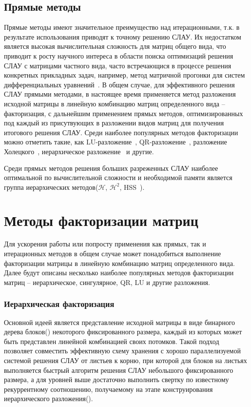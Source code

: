\subsection{Прямые методы}
Прямые методы имеют значительное преимущество над итерационными, т.к. в результате использования приводят к точному решению СЛАУ. Их недостатком является высокая вычислительная сложность для матриц общего вида, что приводит к росту научного интереса в области поиска оптимизаций решения СЛАУ с матрицами частного вида, часто встречающися в процессе решения конкретных прикладных задач, например, метод матричной прогонки для систем дифференциальных уравнений~\cite{progonka}. В общем случае, для эффективного решения СЛАУ прямыми методами, в настоящее время применяется метод разложения исходной матрицы в линейную комбинацию матриц определенного вида -- факторизация, с дальнейшим применением прямых методов, оптимизированных под каждый из присутвующих в разложении видов матриц для получения итогового решения СЛАУ. Среди наиболее популярных методов факторизации можно отметить такие, как LU-разложение~\cite{wikiLU}, QR-разложение~\cite{wikiQR}, разложение Холецкого~\cite{wikiCholesky}, иерархическое разложение~\cite{solverOverview, baseHSS} и другие.


Среди прямых методов решения больших разреженных СЛАУ наиболее оптимальной по вычислительной сложности и необходимой памяти является группа иерархических методов($\mathscr{H}$, $\mathscr{H}^2$, HSS~\cite{baseHSS, fastHSS, probHSS}).


\section{Методы факторизации матриц}
Для ускорения работы или попросту применения как прямых, так и итерационных методов в общем случае может понадобиться выполнение факторизации матрицы в линейную комбинацию матриц определенного вида. Далее будут описаны несколько наиболее популярных методов факторизации матриц -- иерархическое, сингулярное, QR, LU и другие разложения.

\subsubsection{Иерархическая факторизация}
 Основной идеей является представление исходной матрицы в виде бинарного дерева блоков() некоторого фиксированного размера, каждый из которых может быть представлен линейной комбинацией своих потомков. Такой подход позволяет совместить эффективную схему хранения с хорошо параллелизуемой системой решения СЛАУ от листьев к корню, при которой для блоков на листьях выполняется быстрый алгоритм решения СЛАУ небольшого фиксированного размера, а для уровней выше достаточно выполнить свертку по известному рекуррентному соотношению, получаемому на этапе конструирования иерархического разложения().


